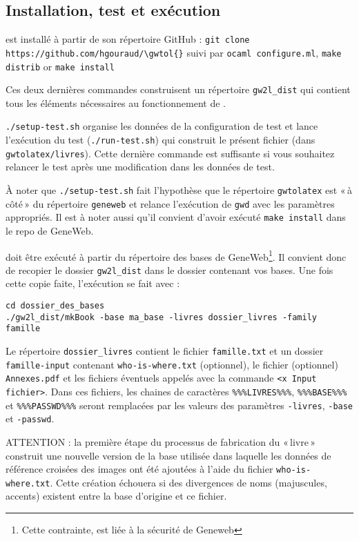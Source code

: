 \subsection{Installation, test et exécution}

\gwtol{} est installé à partir de son répertoire GitHub :
\verb|git clone https://github.com/hgouraud/\gwtol{}|
suivi par
\verb|ocaml configure.ml|, \verb|make distrib| or \verb|make install|

Ces deux dernières commandes construisent un répertoire \verb|gw2l_dist| qui
contient tous les éléments nécessaires au fonctionnement de \gwtol{}.

\verb|./setup-test.sh| organise les données de la configuration de test et
lance l'exécution du test (\verb|./run-test.sh|) qui construit le présent
fichier (dans \verb|gwtolatex/livres|). Cette dernière commande est
suffisante si vous souhaitez relancer le test après une modification
dans les données de test.

À noter que \verb|./setup-test.sh| fait l'hypothèse que le répertoire
\verb|gwtolatex| est «\,à côté\,» du répertoire \verb|geneweb| et relance
l'exécution de \verb|gwd| avec les paramètres appropriés. Il est à noter
aussi qu'il convient d'avoir exécuté \verb|make install| dans le repo de GeneWeb.

\gwtol{} doit être exécuté à partir du répertoire des bases de
GeneWeb\footnote{Cette contrainte, est liée à la sécurité de Geneweb}.
Il convient donc de recopier le dossier \verb|gw2l_dist| dans le
dossier contenant vos bases. Une fois cette copie faite, l'exécution se
fait avec :
\begin{verbatim}
cd dossier_des_bases
./gw2l_dist/mkBook -base ma_base -livres dossier_livres -family famille
\end{verbatim}

Le répertoire \verb|dossier_livres| contient le fichier \verb|famille.txt|
et un dossier
\verb|famille-input| contenant \verb|who-is-where.txt| (optionnel),
le fichier (optionnel) \verb|Annexes.pdf|
et les fichiers éventuels appelés avec la commande \verb|<x Input fichier>|.
Dans ces fichiers, les chaines de caractères \verb|%%%LIVRES%%%|,
\verb|%%%BASE%%%| et \verb|%%%PASSWD%%%| seront remplacées par les valeurs
des paramètres \verb|-livres|, \verb|-base| et \verb|-passwd|.

ATTENTION : la première étape du processus de fabrication du «\,livre\,»
construit une nouvelle version de la base utilisée dans laquelle les
données de référence croisées des images ont été ajoutées à l'aide du
fichier \verb|who-is-where.txt|.
Cette création échouera si des divergences de noms (majuscules, accents)
existent entre la base d'origine et ce fichier.

